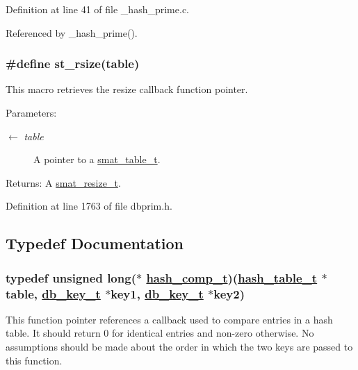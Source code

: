 Definition at line 41 of file \_\-hash\_\-prime.c.

Referenced by \_\-hash\_\-prime().\hypertarget{group__dbprim__hash_ga46}{
\subsubsection[st\_\-rsize]{\setlength{\rightskip}{0pt plus 5cm}\#define st\_\-rsize(table)}}
\label{group__dbprim__hash_ga46}


This macro retrieves the resize callback function pointer.

\begin{Desc}
\item[Parameters:]
\begin{description}
\item[\mbox{$\leftarrow$} {\em table}]A pointer to a \hyperlink{group__dbprim__smat_ga0}{smat\_\-table\_\-t}.\end{description}
\end{Desc}
\begin{Desc}
\item[Returns:]A \hyperlink{group__dbprim__smat_ga3}{smat\_\-resize\_\-t}.\end{Desc}


Definition at line 1763 of file dbprim.h.

\subsection{Typedef Documentation}
\hypertarget{group__dbprim__hash_ga5}{
\subsubsection[hash\_\-comp\_\-t]{\setlength{\rightskip}{0pt plus 5cm}typedef unsigned long($\ast$ \hyperlink{group__dbprim__hash_ga5}{hash\_\-comp\_\-t})(\hyperlink{struct__hash__table__s}{hash\_\-table\_\-t} $\ast$table, \hyperlink{struct__db__key__s}{db\_\-key\_\-t} $\ast$key1, \hyperlink{struct__db__key__s}{db\_\-key\_\-t} $\ast$key2)}}
\label{group__dbprim__hash_ga5}


This function pointer references a callback used to compare entries in a hash table. It should return 0 for identical entries and non-zero otherwise. No assumptions should be made about the order in which the two keys are passed to this function.


